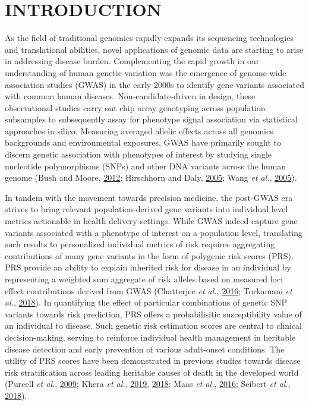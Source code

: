 \documentclass[a4paper,twoside, 9pt]{article}
\begin{document}
\section{\uppercase{Introduction}}
\label{sec:introduction}

\noindent As the field of traditional genomics rapidly expands its sequencing
technologies and translational abilities, novel applications of genomic
data are starting to arise in addressing disease burden. Complementing
the rapid growth in our understanding of human genetic variation was the
emergence of genome-wide association studies (GWAS) in the early 2000s
to identify gene variants associated with common human diseases.
Non-candidate-driven in design, these observational studies carry out
chip array genotyping across population subsamples to subsequently assay
for phenotype signal association via statistical approaches in silico.
Measuring averaged allelic effects across all genomics backgrounds and
environmental exposures, GWAS have primarily sought to discern genetic
association with phenotypes of interest by studying single nucleotide
polymorphisms (SNPs) and other DNA variants across the human genome
(Bush and Moore, \protect\hyperlink{ref-iFUfVw9V}{2012}; Hirschhorn and
Daly, \protect\hyperlink{ref-5cdeEdUS}{2005}; Wang \emph{et al.},
\protect\hyperlink{ref-12kQ0EOWQ}{2005}).

In tandem with the movement towards precision medicine, the post-GWAS
era strives to bring relevant population-derived gene variants into
individual level metrics actionable in health delivery settings. While
GWAS indeed capture gene variants associated with a phenotype of
interest on a population level, translating such results to personalized
individual metrics of risk requires aggregating contributions of many
gene variants in the form of polygenic risk scores (PRS). PRS provide an
ability to explain inherited risk for disease in an individual by
representing a weighted sum aggregate of risk alleles based on measured
loci effect contributions derived from GWAS (Chatterjee \emph{et al.},
\protect\hyperlink{ref-auyRflEe}{2016}; Torkamani \emph{et al.},
\protect\hyperlink{ref-1GK3F1BxE}{2018}). In quantifying the effect of
particular combinations of genetic SNP variants towards risk prediction,
PRS offers a probabilisitic susceptibility value of an individual to
disease. Such genetic risk estimation scores are central to clinical
decision-making, serving to reinforce individual health management in
heritable disease detection and early prevention of various adult-onset
conditions. The utility of PRS scores have been demonstrated in previous
studies towards disease risk stratification across leading heritable
causes of death in the developed world
(Purcell \emph{et al.}, \protect\hyperlink{ref-mwTa2RUK}{2009}; 
Khera \emph{et al.}, \protect\hyperlink{ref-oBD9eYkN}{2019},
\protect\hyperlink{ref-Gh0gKn77}{2018}; Maas \emph{et al.},
\protect\hyperlink{ref-Z12fynub}{2016}; Seibert \emph{et al.},
\protect\hyperlink{ref-gkABDVTx}{2018}).
\end{document}
